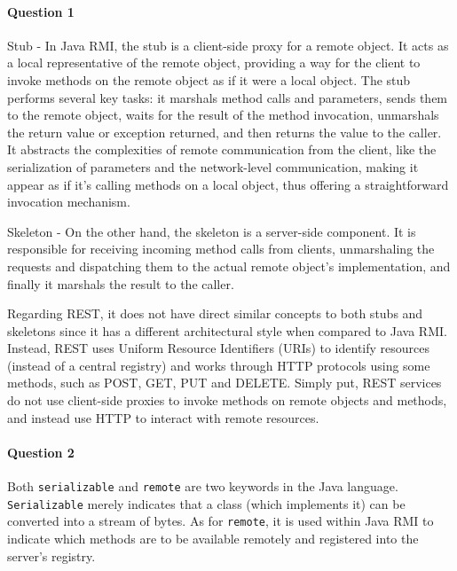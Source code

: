 \documentclass{ds-report}
\begin{document}
	\maketitle

	\paragraph{Question 1} 
        Stub - In Java RMI, the stub is a client-side proxy for a remote object. It acts as a local representative of the remote object, providing a way for the client to invoke methods on the remote object as if it were a local object. The stub performs several key tasks: it marshals method calls and parameters, sends them to the remote object, waits for the result of the method invocation, unmarshals the return value or exception returned, and then returns the value to the caller. It abstracts the complexities of remote communication from the client, like the serialization of parameters and the network-level communication, making it appear as if it's calling methods on a local object, thus offering a straightforward invocation mechanism.
    
        Skeleton - On the other hand, the skeleton is a server-side component. It is responsible for receiving incoming method calls from clients, unmarshaling the requests and dispatching them to the actual remote object's implementation, and finally it marshals the result to the caller.

        Regarding REST, it does not have direct similar concepts to both stubs and skeletons since it has a different architectural style when compared to Java RMI. Instead, REST uses Uniform Resource Identifiers (URIs) to identify resources (instead of a central registry) and works through HTTP protocols using some methods, such as POST, GET, PUT and DELETE. Simply put, REST services do not use client-side proxies to invoke methods on remote objects and methods, and instead use HTTP to interact with remote resources.

	\paragraph{Question 2} 
    Both \texttt{serializable} and \texttt{remote} are two keywords in the Java language. \texttt{Serializable} merely indicates that a class (which implements it) can be converted into a stream of bytes. As for \texttt{remote}, it is used within Java RMI to indicate which methods are to be available remotely and registered into the server's registry.
    
\end{document}
